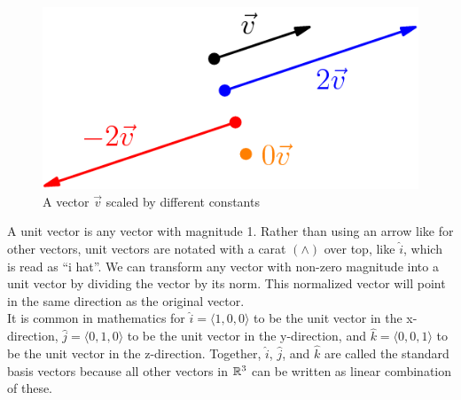 \begin{figure}[H]
	\centering
	\includegraphics[scale=0.5]{./Images/backgroundReview/ScalarMultiples.png}
	\caption{A vector $\vec{v}$ scaled by different constants}
\end{figure}

\noindent
A unit vector is any vector with magnitude 1.
Rather than using an arrow like for other vectors, unit vectors are notated with a carat $\left(\wedge \right)$ over top, like $\hat{i}$, which is read as ``i hat''.
We can transform any vector with non-zero magnitude into a unit vector by dividing the vector by its norm.
This normalized vector will point in the same direction as the original vector.\\

\noindent
It is common in mathematics for $\hat{i} = \langle 1,0,0 \rangle$ to be the unit vector in the x-direction, $\hat{j} = \langle 0,1,0 \rangle$ to be the unit vector in the y-direction, and $\hat{k} = \langle 0,0,1 \rangle$ to be the unit vector in the z-direction.
Together, $\hat{i}$, $\hat{j}$, and $\hat{k}$ are called the standard basis vectors because all other vectors in $\mathbb{R}^3$ can be written as linear combination of these.

